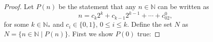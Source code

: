 \documentclass[11pt,twoside, reqno, align]{amsart}
\theoremstyle{remark}
\def\N{\mathbb N}
\begin{document}
\begin{proof}



Let $P(n)$ be the statement that any $n \in \N$ can be written as
$$
n=c_k2^k+c_{k-1}2^{k-1}+\cdots+c_02^0,
$$
for some $k \in \N_*$ and $c_i \in \{0,1\}$, $0 \leq i \leq k$. Define the set $N$ as $N = \{ n \in \N \mid P(n)\}$. First we show $P(0)$ true:

\end{proof}
\end{document}
